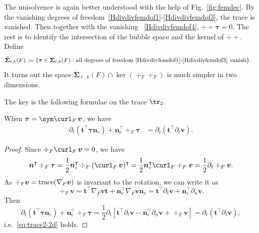 The unisolvence is again better understood with the help of Fig.~\ref{fig:femdec}. 
By the vanishing degrees of freedom~\eqref{Hdivdivfemdof1}-\eqref{Hdivdivfemdof3}, the trace is vanished. Then together with the vanishing ~\eqref{Hdivdivfemdof4}, $\div \div \boldsymbol \tau = 0$. The rest is to identify the intersection of the bubble space and the kernel of $\div\div$. Define
\begin{align*}
\mathring{\boldsymbol \Sigma}_{\ell,k}(F)&:=\{\boldsymbol  \tau\in\boldsymbol \Sigma_{\ell,k}(F): \textrm{all degrees of freedom~\eqref{Hdivdivfemdof1}-\eqref{Hdivdivfemdof3} vanish}\}.%
\end{align*}
It turns out the space $\mathring{\boldsymbol \Sigma}_{\ell,k}(F)\cap \ker(\div_F\div_F)$ is much simpler in two dimensions. 

The key is the following formulae on the trace $\tr_2$. 
\begin{lemma}\label{lm:tauv}
When $\boldsymbol  \tau = \sym \curl_F \, \boldsymbol  v$, we have
\begin{align}
\label{eq:trace2-2d} \partial_{t}(\boldsymbol  t^{\intercal}\boldsymbol \tau\boldsymbol  n_{e})+\boldsymbol  n_{e}^{\intercal}\div_F\boldsymbol \tau & =  \partial_t(\boldsymbol  t^{\intercal}\partial_t\boldsymbol  v).
\end{align}
\end{lemma}
\begin{proof}
Since $\div_F \curl_F \, \boldsymbol  v = 0$, we have
$$\boldsymbol  n^{\intercal}\div_F\boldsymbol \tau  = \frac{1}{2}\boldsymbol  n_{e}^{\intercal} \div_F ( \curl_F \, \boldsymbol  v)^{\intercal} = \frac{1}{2}\boldsymbol  n_{e}^{\intercal} \curl_F \div_F \boldsymbol  v =  \frac{1}{2} \partial_t \div_F \boldsymbol  v.$$
As $\div_F\boldsymbol  v = {\rm trace} (\nabla_F\boldsymbol  v)$ is invariant to the rotation, we can write it as
$$
\div_F \boldsymbol  v = \boldsymbol  t^{\intercal}\nabla_F\boldsymbol  v \boldsymbol  t + \boldsymbol  n_{e}^{\intercal}\nabla_F\boldsymbol  v \boldsymbol  n_{e} =  \boldsymbol  t^{\intercal}\partial_t\boldsymbol  v + \boldsymbol  n_{e}^{\intercal}\partial_n\boldsymbol  v.
$$
Then
$$
 \partial_{t}(\boldsymbol  t^{\intercal}\boldsymbol \tau\boldsymbol  n_{e})+\boldsymbol  n_{e}^{\intercal}\div_F\boldsymbol \tau  =\frac{1}{2}\partial_t[  \boldsymbol  t^{\intercal}\partial_t\boldsymbol  v -  \boldsymbol  n_{e}^{\intercal}\partial_n\boldsymbol  v + \div_F\boldsymbol  v]  =  \partial_t  (\boldsymbol  t^{\intercal}\partial_t\boldsymbol  v),
 $$
 i.e.~\eqref{eq:trace2-2d} holds.
\end{proof}


